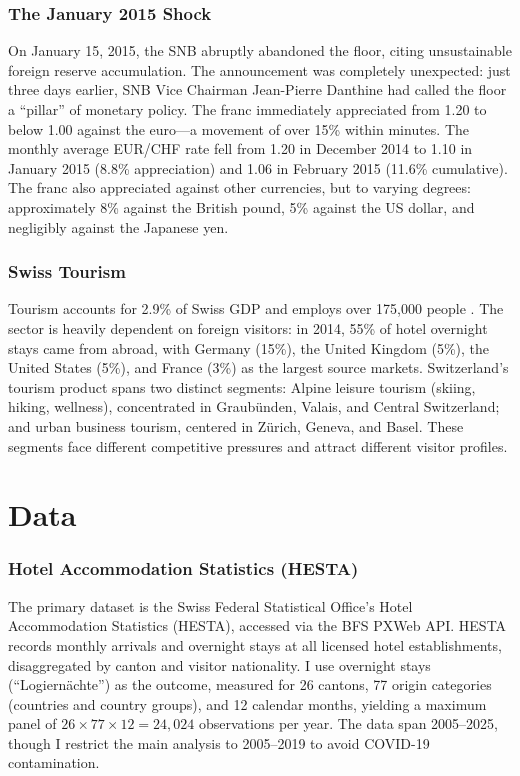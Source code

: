 \documentclass[12pt]{article}
\begin{document}
\subsubsection*{The January 2015 Shock} On January 15, 2015, the SNB abruptly abandoned the floor, citing unsustainable foreign reserve accumulation. The announcement was completely unexpected: just three days earlier, SNB Vice Chairman Jean-Pierre Danthine had called the floor a ``pillar'' of monetary policy. The franc immediately appreciated from 1.20 to below 1.00 against the euro---a movement of over 15\% within minutes. The monthly average EUR/CHF rate fell from 1.20 in December 2014 to 1.10 in January 2015 (8.8\% appreciation) and 1.06 in February 2015 (11.6\% cumulative). The franc also appreciated against other currencies, but to varying degrees: approximately 8\% against the British pound, 5\% against the US dollar, and negligibly against the Japanese yen.

\subsubsection*{Swiss Tourism} Tourism accounts for 2.9\% of Swiss GDP and employs over 175,000 people \citep{BFS2023}. The sector is heavily dependent on foreign visitors: in 2014, 55\% of hotel overnight stays came from abroad, with Germany (15\%), the United Kingdom (5\%), the United States (5\%), and France (3\%) as the largest source markets. Switzerland's tourism product spans two distinct segments: Alpine leisure tourism (skiing, hiking, wellness), concentrated in Graubünden, Valais, and Central Switzerland; and urban business tourism, centered in Zürich, Geneva, and Basel. These segments face different competitive pressures and attract different visitor profiles.

\section{Data}

\subsubsection*{Hotel Accommodation Statistics (HESTA)} The primary dataset is the Swiss Federal Statistical Office's Hotel Accommodation Statistics (HESTA), accessed via the BFS PXWeb API. HESTA records monthly arrivals and overnight stays at all licensed hotel establishments, disaggregated by canton and visitor nationality. I use overnight stays (``Logiernächte'') as the outcome, measured for 26 cantons, 77 origin categories (countries and country groups), and 12 calendar months, yielding a maximum panel of $26 \times 77 \times 12 = 24{,}024$ observations per year. The data span 2005--2025, though I restrict the main analysis to 2005--2019 to avoid COVID-19 contamination.
\end{document}
